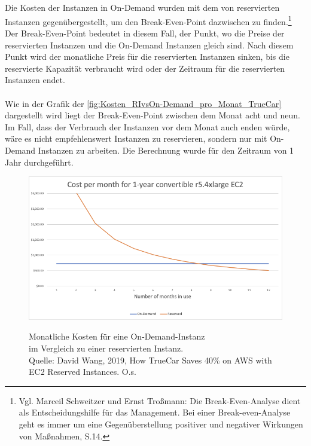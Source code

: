 \\\\
Die Kosten der Instanzen in On-Demand wurden mit dem von reservierten Instanzen gegenübergestellt, um den Break-Even-Point dazwischen zu finden.\footnote{Vgl. Marceil Schweitzer und Ernst Troßmann: Die Break-Even-Analyse dient als Entscheidungshilfe für das Management. Bei einer Break-even-Analyse geht es immer um eine Gegenüberstellung positiver und negativer Wirkungen von Maßnahmen, S.14.\cite{BEA}} Der Break-Even-Point bedeutet in diesem Fall, der Punkt, wo die Preise der reservierten Instanzen und die On-Demand Instanzen gleich sind. Nach diesem Punkt wird der monatliche Preis für die reservierten Instanzen sinken, bis die reservierte Kapazität verbraucht wird oder der Zeitraum für die reservierten Instanzen endet.
\\\\
Wie in der Grafik der \autoref{fig:Kosten_RIvsOn-Demand_pro_Monat_TrueCar} dargestellt wird liegt der Break-Even-Point zwischen dem Monat acht und neun. Im Fall, dass der Verbrauch der Instanzen vor dem Monat auch enden würde, wäre es nicht empfehlenswert Instanzen zu reservieren, sondern nur mit On-Demand Instanzen zu arbeiten. Die Berechnung wurde für den Zeitraum von 1 Jahr durchgeführt. %
\begin{figure}[h!]
  \centering
  \includegraphics[scale=0.6]{sources/Kosten_RIvsOn-Demand_pro_Monat_TrueCar}\label{fig:Kosten_RIvsOn-Demand_pro_Monat_TrueCar}\\
  \caption[Monatliche Kosten für eine On-Demand-Instanz im Vergleich zu einer reservierten Instanz]{}
  \label{fig:Kosten_RIvsOn-Demand_pro_Monat_TrueCar}Monatliche Kosten für eine On-Demand-Instanz\\ im Vergleich zu einer reservierten Instanz.\\
  Quelle: David Wang, 2019, How TrueCar Saves 40\% on AWS with EC2 Reserved Instances. O.s.\cite{MED1}
\end{figure}
